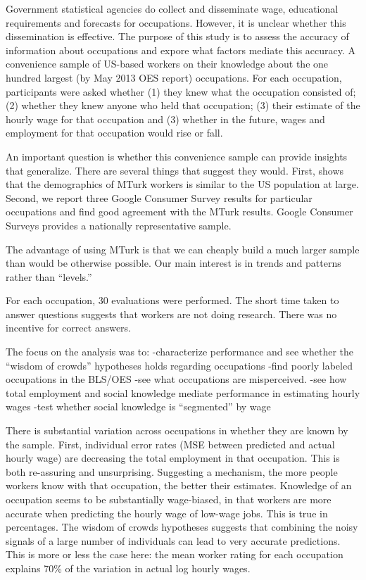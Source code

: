 \documentclass[11pt]{article}
\begin{document}
Government statistical agencies do collect and disseminate wage, educational requirements and forecasts for occupations. 
However, it is unclear whether this dissemination is effective. 
The purpose of this study is to assess the accuracy of information about occupations and expore what factors mediate this accuracy. 
A convenience sample of US-based workers on their knowledge about the one hundred largest (by May 2013 OES report) occupations.  
For each occupation, participants were asked whether (1) they knew what the occupation consisted of; (2) whether they knew anyone who held that occupation; (3) their estimate of the hourly wage for that occupation and (3) whether in the future, wages and employment for that occupation would rise or fall. 

An important question is whether this convenience sample can provide insights that generalize. 
There are several things that suggest they would. 
First, \cite{TK} shows that the demographics of MTurk workers is similar to the US population at large. 
Second, we report three Google Consumer Survey results for particular occupations and find good agreement with the MTurk results. 
Google Consumer Surveys provides a nationally representative sample.   

The advantage of using MTurk is that we can cheaply build a much larger sample than would be otherwise possible. 
Our main interest is in trends and patterns rather than ``levels.'' 
 
For each occupation, 30 evaluations were performed. 
The short time taken to answer questions suggests that workers are not doing research. 
There was no incentive for correct answers. 

The focus on the analysis was to:
-characterize performance and see whether the ``wisdom of crowds'' hypotheses holds regarding occupations 
-find poorly labeled occupations in the BLS/OES 
-see what occupations are misperceived. 
-see how total employment and social knowledge mediate performance in estimating hourly wages 
-test whether social knowledge is ``segmented'' by wage  

There is substantial variation across occupations in whether they are known by the sample. 
First, individual error rates (MSE between predicted and actual hourly wage) are decreasing the total employment in that occupation. 
This is both re-assuring and unsurprising. 
Suggesting a mechanism, the more people workers know with that occupation, the better their estimates.  
Knowledge of an occupation seems to be substantially wage-biased, in that workers are more accurate when predicting the hourly wage of low-wage jobs. 
This is true in percentages.  
The wisdom of crowds hypotheses suggests that combining the noisy signals of a large number of individuals can lead to very accurate predictions. 
This is more or less the case here: the mean worker rating for each occupation explains 70\% of the variation in actual log hourly wages.  
\end{document}
